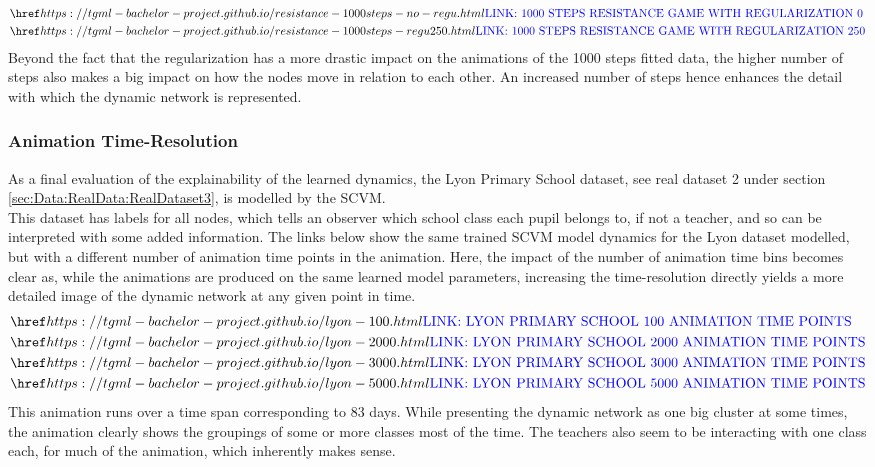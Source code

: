\begin{align*}
    &\bluehref{https://tgml-bachelor-project.github.io/resistance-1000steps-no-regu.html}{\text{LINK: 1000 STEPS RESISTANCE GAME WITH REGULARIZATION 0}} \\
    &\bluehref{https://tgml-bachelor-project.github.io/resistance-1000steps-regu250.html}{\text{LINK: 1000 STEPS RESISTANCE GAME WITH REGULARIZATION 250}}
\end{align*}
Beyond the fact that the regularization has a more drastic impact on the animations of the 1000 steps fitted data, the higher number of steps also makes a big impact on how the nodes move in relation to each other.
An increased number of steps hence enhances the detail with which the dynamic network is represented.


\subsubsection{Animation Time-Resolution}
\label{sec:ResearchQuestion3:Lyon}
As a final evaluation of the explainability of the learned dynamics, the Lyon Primary School dataset, see real dataset 2 under section \ref{sec:Data:RealData:RealDataset3}, is modelled by the SCVM.
\\
This dataset has labels for all nodes, which tells an observer which school class each pupil belongs to, if not a teacher, and so can be interpreted with some added information. 
The links below show the same trained SCVM model dynamics for the Lyon dataset modelled, but with a different number of animation time points in the animation. 
Here, the impact of the number of animation time bins becomes clear as, while the animations are produced on the same learned model parameters, increasing the time-resolution directly yields a more detailed image of the dynamic network at any given point in time.  
\begin{align*}
    &\bluehref{https://tgml-bachelor-project.github.io/lyon-100.html}{\text{LINK: LYON PRIMARY SCHOOL 100 ANIMATION TIME POINTS}} \\
    &\bluehref{https://tgml-bachelor-project.github.io/lyon-2000.html}{\text{LINK: LYON PRIMARY SCHOOL 2000 ANIMATION TIME POINTS}} \\
    &\bluehref{https://tgml-bachelor-project.github.io/lyon-3000.html}{\text{LINK: LYON PRIMARY SCHOOL 3000 ANIMATION TIME POINTS}} \\
    &\bluehref{https://tgml-bachelor-project.github.io/lyon-5000.html}{\text{LINK: LYON PRIMARY SCHOOL 5000 ANIMATION TIME POINTS}}
\end{align*}
\noindent
This animation runs over a time span corresponding to 83 days. 
While presenting the dynamic network as one big cluster at some times, the animation clearly shows the groupings of some or more classes most of the time.
The teachers also seem to be interacting with one class each, for much of the animation, which inherently makes sense.

